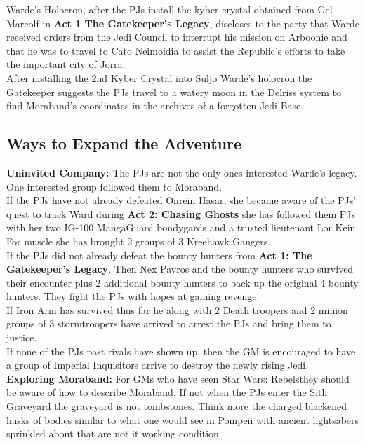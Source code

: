 \documentclass[twoside]{article}
\begin{document}
Warde's Holocron, after the PJs install the kyber crystal obtained from Gel Marcolf in \textbf{Act 1 The Gatekeeper's Legacy}, discloses to the party that Warde received orders from the Jedi Council to interrupt his mission on Arboonie and that he was to travel to Cato Neimoidia to assist the Republic's efforts to take the important city of Jorra.\\

After installing the 2nd Kyber Crystal into Suljo Warde's holocron the Gatekeeper suggests the PJs travel to a watery moon in the Delriss system to find Moraband's coordinates in the archives of a forgotten Jedi Base.\\

\subsection{Ways to Expand the Adventure}
\textbf{Uninvited Company:} The PJs are not the only ones interested Warde's legacy.  One interested group followed them to Moraband.\\

If the PJs have not already defeated Onrein Hasar, she became aware of the PJs' quest to track Ward during \textbf{Act 2: Chasing Ghosts} she has followed them PJs with her two IG-100 MangaGuard bondygards and a trusted lieutenant Lor Kein.  For muscle she has brought  2 groups of 3 Kreehawk Gangers.\\

If the PJs did not already defeat the bounty hunters from \textbf{Act 1: The Gatekeeper's Legacy}.  Then Nex Pavros and the bounty hunters who survived their encounter plus 2 additional bounty hunters to back up the original 4 bounty hunters.  They fight the PJs with hopes at gaining revenge.\\

If Iron Arm has survived thus far he along with 2 Death troopers and 2 minion groups of 3 stormtroopers have arrived to arrest the PJs and bring them to justice.\\

If none of the PJs past rivals have shown up, then the GM is encouraged to have a group of Imperial Inquisitors arrive to destroy the newly rising Jedi.\\

\textbf{Exploring Moraband:} For GMs who have seen Star Wars: Rebels\texttrademark they should be aware of how to describe Moraband.  If not when the PJs enter the Sith Graveyard the graveyard is not tombstones.  Think more the charged blackened husks of bodies similar to what one would see in Pompeii with ancient lightsabers sprinkled about that are not it working condition.\\
\end{document}
